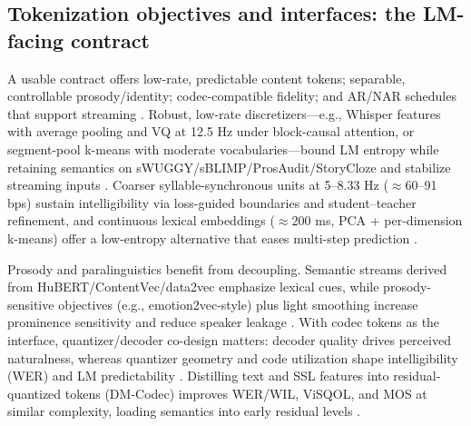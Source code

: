 \documentclass{article}
\begin{document}
\subsection{Tokenization objectives and interfaces: the LM-facing contract} \label{subsec:tokenizationobjectivesandinterfaces:thelm-facingcontract}
A usable contract offers low-rate, predictable content tokens; separable, controllable prosody/identity; codec-compatible fidelity; and AR/NAR schedules that support streaming \cite{guo2025recentadvancesdiscretespeechtokensreview}. Robust, low-rate discretizers---e.g., Whisper features with average pooling and VQ at 12.5 Hz under block-causal attention, or segment-pool k-means with moderate vocabularies---bound LM entropy while retaining semantics on sWUGGY/sBLIMP/ProsAudit/StoryCloze and stabilize streaming inputs \cite{zeng2024scalingspeechtextpretrainingsyntheticint,kando2025exploringeffectsegmentationvocabularysiz}. Coarser syllable-synchronous units at 5--8.33 Hz ($\approx$60--91 bps) sustain intelligibility via loss-guided boundaries and student--teacher refinement, and continuous lexical embeddings ($\approx$200 ms, PCA + per-dimension k-means) offer a low-entropy alternative that eases multi-step prediction \cite{baade2024syllablelmlearningcoarsesemanticunitsspe,algayres2023generativespokenlanguagemodelbasedcontin}.

Prosody and paralinguistics benefit from decoupling. Semantic streams derived from HuBERT/ContentVec/data2vec emphasize lexical cues, while prosody-sensitive objectives (e.g., emotion2vec-style) plus light smoothing increase prominence sensitivity and reduce speaker leakage \cite{onda2025benchmarkingprosodyencodingdiscretespeec}. With codec tokens as the interface, quantizer/decoder co-design matters: decoder quality drives perceived naturalness, whereas quantizer geometry and code utilization shape intelligibility (WER) and LM predictability \cite{li2024investigatingneuralaudiocodecsspeechlang}. Distilling text and SSL features into residual-quantized tokens (DM-Codec) improves WER/WIL, ViSQOL, and MOS at similar complexity, loading semantics into early residual levels \cite{ahasan2025dmcodecdistillingmultimodalrepresentatio}.
\end{document}
